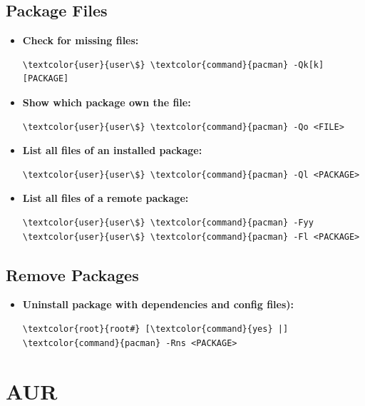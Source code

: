 \documentclass[10pt, a4paper, onecolumn, oneside, titlepage, openany]{book}
\begin{document}
\section{Package Files}
\begin{itemize}
    \item \textbf{Check for missing files:}
\begin{Verbatim}[commandchars=\\\{\}]
\textcolor{user}{user\$} \textcolor{command}{pacman} -Qk[k] [PACKAGE]
\end{Verbatim}
    \item \textbf{Show which package own the file:}
\begin{Verbatim}[commandchars=\\\{\}]
\textcolor{user}{user\$} \textcolor{command}{pacman} -Qo <FILE>
\end{Verbatim}
    \item \textbf{List all files of an installed package:}
\begin{Verbatim}[commandchars=\\\{\}]
\textcolor{user}{user\$} \textcolor{command}{pacman} -Ql <PACKAGE>
\end{Verbatim}
    \item \textbf{List all files of a remote package:}
\begin{Verbatim}[commandchars=\\\{\}]
\textcolor{user}{user\$} \textcolor{command}{pacman} -Fyy
\textcolor{user}{user\$} \textcolor{command}{pacman} -Fl <PACKAGE>
\end{Verbatim}
\end{itemize}

\section{Remove Packages}
\begin{itemize}
    \item \textbf{Uninstall package with dependencies and config files):}
\begin{Verbatim}[commandchars=\\\{\}]
\textcolor{root}{root#} [\textcolor{command}{yes} |] \textcolor{command}{pacman} -Rns <PACKAGE>
\end{Verbatim}
\end{itemize}


\chapter{AUR}
\end{document}
